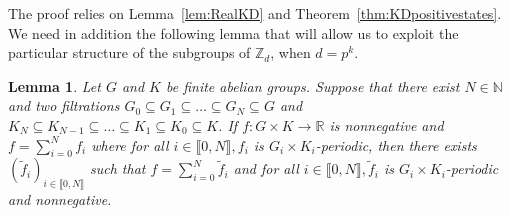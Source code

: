 \documentclass[a4paper, notitlepage, 11pt]{article}
\numberwithin{equation}{section}
\newcommand{\N}{\mathbb{N}}
\newcommand{\Z}{\mathbb{Z}}
\newcommand{\R}{\mathbb{R}}
\newcommand{\IntEnt}[2]{\llbracket #1 , #2 \rrbracket}
\newtheorem{Lemma}[Theorem]{Lemma}
\begin{document}
The proof relies on Lemma~\ref{lem:RealKD} and Theorem~\ref{thm:KDpositivestates}. We need in addition the following lemma that will allow us to exploit the particular structure of the subgroups of $\Z_d$, when $d=p^k$.
\begin{Lemma}\label{lem:Sum}
Let $G$ and $K$ be finite abelian groups. Suppose that there exist $N\in\N$ and two filtrations $G_{0}\subseteq G_{1} \subseteq \dots \subseteq G_{N} \subseteq G$ and $K_{N}\subseteq K_{N-1} \subseteq \dots \subseteq K_{1} \subseteq K_{0} \subseteq K$. If $f:G\times K \to \R$ is nonnegative and $f = \sum_{i=0}^{N} f_{i}$ where for all $i\in\IntEnt{0}{N}, f_{i}$ is $G_{i}\times K_{i}$-periodic, then there exists $(\tilde{f}_{i})_{i\in\IntEnt{0}{N}}$ such that $f = \sum_{i=0}^{N} \tilde{f}_{i}$ and for all $i\in\IntEnt{0}{N}, \tilde{f}_{i}$ is $G_{i}\times K_{i}$-periodic and nonnegative.
\end{Lemma}
\end{document}
